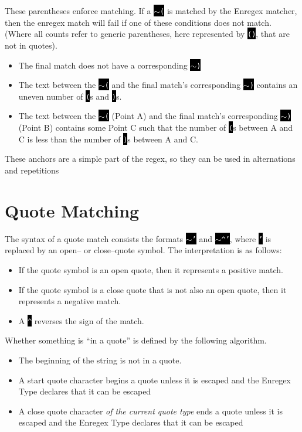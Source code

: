 \documentclass{book}
\newcommand\code\texttt
\newcommand{\codebox}[1]{\leavevmode\colorbox{black}{\textcolor{white}{\code{#1}}}}
\newcommand{\til}{$\sim$}
\begin{document}
These parentheses enforce matching. If a \codebox{\til(} is matched by the Enregex matcher, then the enregex match will fail if one of these conditions does not match. (Where all counts refer to generic parentheses, here represented by \codebox{()}, that are not in quotes).

\begin{itemize}
\item The final match does not have a corresponding \codebox{\til)}
\item The text between the \codebox{\til(} and the final match's corresponding \codebox{\til)} contains an uneven number of \codebox{(}s and \codebox{)}s.
\item The text between the \codebox{\til(} (Point A) and the final match's corresponding \codebox{\til)} (Point B) contains some Point C such that the number of \codebox{(}s between A and C is less than the number of \codebox{)}s between A and C.
\end{itemize}

These anchors are a simple part of the regex, so they can be used in alternations and repetitions

\section{Quote Matching}
The syntax of a quote match consists the formats \codebox{\til'} and \codebox{\til\^{}'}, where \codebox{'} is replaced by an open-- or close--quote symbol. The interpretation is as follows:

\begin{itemize}
\item If the quote symbol is an open quote, then it represents a positive match.
\item If the quote symbol is a close quote that is not also an open quote, then it represents a negative match.
\item A \codebox{\^{}} reverses the sign of the match.
\end{itemize}

Whether something is ``in a quote'' is defined by the following algorithm.

\begin{itemize}
\item The beginning of the string is not in a quote.
\item A start quote character begins a quote unless it is escaped and the Enregex Type declares that it can be escaped
\item A close quote character \emph{of the current quote type} ends a quote unless it is escaped and the Enregex Type declares that it can be escaped
\end{itemize}
\end{document}
